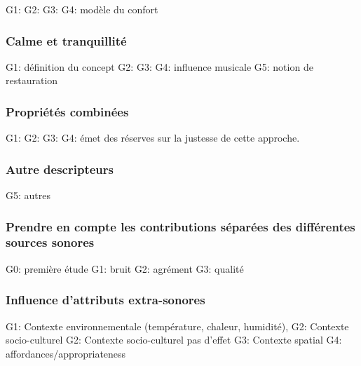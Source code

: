 G1: \citep{yang2005acoustic,meng2013field}
G2: \citep{jeon2011non,jeon2013soundwalk}
G3: \citep{tse2012perception}
G4: \citep{yu2009modeling} modèle du confort

\subsubsection{Calme et tranquillité}

G1: \citep{delaitre2012definition} définition du concept
G2: \citep{pheasant2008acoustic,pheasant2009validation}
G3: \citep{memoli2008soundscape}
G4: \citep{de2006quiet,de2013characterizing} influence musicale
G5: \citep{payne2013production} notion de restauration

\subsubsection{Propriétés combinées}

G1: \citep{davies2013perception}
G2: \citep{cain2013development}
G3: \citep{axelsson2010principal}
G4: \citep{hall2013exploratory} émet des réserves sur la justesse de cette approche.

\subsubsection{Autre descripteurs}

G5: \citep{kang2010semantic} autres

\subsubsection{Prendre en compte les contributions séparées des différentes sources sonores}

G0: \citep{defreville2004aactivity} première étude
G1: \citep{marquis2015simulated} bruit
G2:  \citep{lavandier2006contribution,guillen2007importance} agrément
G3:  \citep{nilsson2007soundscape,ricciardi2015sound} qualité

\subsubsection{Influence d'attributs extra-sonores}

G1: Contexte environnementale (température, chaleur, humidité), \citep{meng2013field,jeon2011non}
G2: Contexte socio-culturel \citep{hall2013exploratory,yu2010factors}
G2: Contexte socio-culturel \citep{guillen2007importance} pas d'effet
G3: Contexte spatial \citep{hall2013exploratory}
G4: affordances/appropriateness \citep{hall2013exploratory}

